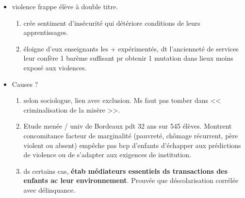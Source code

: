 \documentclass[12pt]{report}
\begin{document}
\begin{itemize}

\vspace{0.5cm}

\item  violence frappe élève à double titre.
\begin{enumerate}
\item crée sentiment d'insécurité qui détériore conditions de leurs apprentissages.\\
\item éloigne d'eux enseignants les + expérimentés, dt l'ancienneté de services leur confère 1 barème suffisant pr obtenir 1 mutation dans lieux moins exposé aux violences.\\
\end{enumerate}

\item Causes ?
\begin{enumerate}
\item selon sociologue, lien avec exclusion. Ms faut pas tomber dans << criminalisation de la misère >>.
\item Etude menée / univ  de Bordeaux pdt 32 ans sur 545 élèves. Montrent concomitance facteur de marginalité (pauvreté, chômage récurrent, père violent ou absent) empêche pas bcp d'enfants d'échapper aux prédictions de violence ou de s'adapter aux exigences de institution.\\
\item ds certains cas, \textbf{étab médiateurs essentiels ds transactions des enfants ac leur environnement}. Prouvée que déscolarisation corrélée avec délinquance.
\end{enumerate}


\end{itemize}
\end{document}
